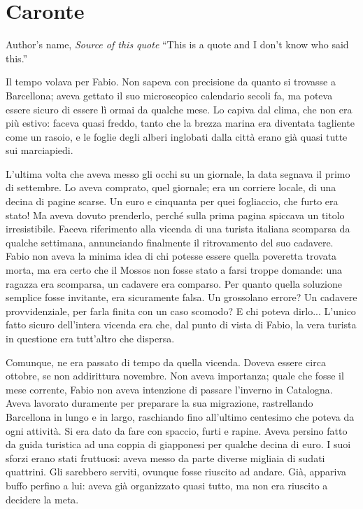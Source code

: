 \chapter{Caronte}

\begin{chapquote}{Author's name, \textit{Source of this quote}}
``This is a quote and I don't know who said this.''
\end{chapquote}


Il tempo volava per Fabio. Non sapeva con precisione da quanto si trovasse a Barcellona; aveva gettato il suo microscopico calendario secoli fa, ma poteva essere sicuro di essere lì ormai da qualche mese. Lo capiva dal clima, che non era più estivo: faceva quasi freddo, tanto che la brezza marina era diventata tagliente come un rasoio, e le foglie degli alberi inglobati dalla città erano già quasi tutte sui marciapiedi.

L'ultima volta che aveva messo gli occhi su un giornale, la data segnava il primo di settembre. Lo aveva comprato, quel giornale; era un corriere locale, di una decina di pagine scarse. Un euro e cinquanta per quei fogliaccio, che furto era stato! Ma aveva dovuto prenderlo, perché sulla prima pagina spiccava un titolo irresistibile. Faceva riferimento alla vicenda di una turista italiana scomparsa da qualche settimana, annunciando finalmente il ritrovamento del suo cadavere. Fabio non aveva la minima idea di chi potesse essere quella poveretta trovata morta, ma era certo che il Mossos non fosse stato a farsi troppe domande: una ragazza era scomparsa, un cadavere era comparso. Per quanto quella soluzione semplice fosse invitante, era sicuramente falsa. Un grossolano errore? Un cadavere provvidenziale, per farla finita con un caso scomodo? E chi poteva dirlo... L'unico fatto sicuro dell'intera vicenda era che, dal punto di vista di Fabio, la vera turista in questione era tutt'altro che dispersa.

Comunque, ne era passato di tempo da quella vicenda. Doveva essere circa ottobre, se non addirittura novembre. Non aveva importanza; quale che fosse il mese corrente, Fabio non aveva intenzione di passare l'inverno in Catalogna. Aveva lavorato duramente per preparare la sua migrazione, rastrellando Barcellona in lungo e in largo, raschiando fino all'ultimo centesimo che poteva da ogni attività. Si era dato da fare con spaccio, furti e rapine. Aveva persino fatto da guida turistica ad una coppia di giapponesi per qualche decina di euro. I suoi sforzi erano stati fruttuosi: aveva messo da parte diverse migliaia di sudati quattrini. Gli sarebbero serviti, ovunque fosse riuscito ad andare. Già, appariva buffo perfino a lui: aveva già organizzato quasi tutto, ma non era riuscito a decidere la meta.

